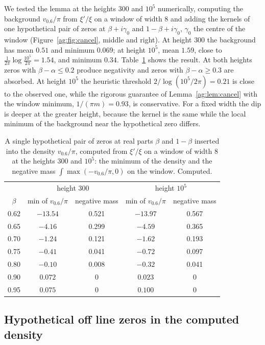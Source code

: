 We tested the lemma at the heights $300$ and $10^5$ numerically, computing the background $v_{0.6}/\pi$ from $\xi'/\xi$ on a window of width $8$ and adding the kernels of one hypothetical pair of zeros at $\beta+i\gamma_0$ and $1-\beta+i\gamma_0$, $\gamma_0$ the centre of the window (Figure~\ref{ag:fig:cancel}, middle and right). At height $300$ the background has mean $0.51$ and minimum $0.069$; at height $10^5$, mean $1.59$, close to $\frac1{2\pi}\log\frac{10^5}{2\pi}=1.54$, and minimum $0.34$. Table~\ref{ag:tab:cancel} shows the result. At both heights zeros with $\beta-\alpha\le0.2$ produce negativity and zeros with $\beta-\alpha\ge0.3$ are absorbed. At height $10^5$ the heuristic threshold $2/\log(10^5/2\pi)=0.21$ is close to the observed one, while the rigorous guarantee of Lemma~\ref{ag:lem:cancel} with the window minimum, $1/(\pi m)=0.93$, is conservative. For a fixed width the dip is deeper at the greater height, because the kernel is the same while the local minimum of the background near the hypothetical zero differs.

\begin{table}[htbp]
\centering\small
\begin{tabular}{ccccc}
\toprule
 & \multicolumn{2}{c}{height 300} & \multicolumn{2}{c}{height $10^5$}\\
$\beta$ & min of $v_{0.6}/\pi$ & negative mass & min of $v_{0.6}/\pi$ & negative mass\\
\midrule
0.62 & $-13.54$ & 0.521 & $-13.97$ & 0.567\\
0.65 & $-4.16$ & 0.299 & $-4.59$ & 0.365\\
0.70 & $-1.24$ & 0.121 & $-1.62$ & 0.193\\
0.75 & $-0.41$ & 0.041 & $-0.72$ & 0.097\\
0.80 & $-0.10$ & 0.008 & $-0.32$ & 0.041\\
0.90 & $0.072$ & 0 & $0.023$ & 0\\
0.95 & $0.075$ & 0 & $0.100$ & 0\\
\bottomrule
\end{tabular}
\caption{A single hypothetical pair of zeros at real parts $\beta$ and $1-\beta$ inserted into the density $v_{0.6}/\pi$, computed from $\xi'/\xi$ on a window of width $8$ at the heights $300$ and $10^5$: the minimum of the density and the negative mass $\int\max(-v_{0.6}/\pi,0)$ on the window. Computed.}
\label{ag:tab:cancel}
\end{table}

\subsection{Hypothetical off line zeros in the computed density}\label{ag:sec:num}


